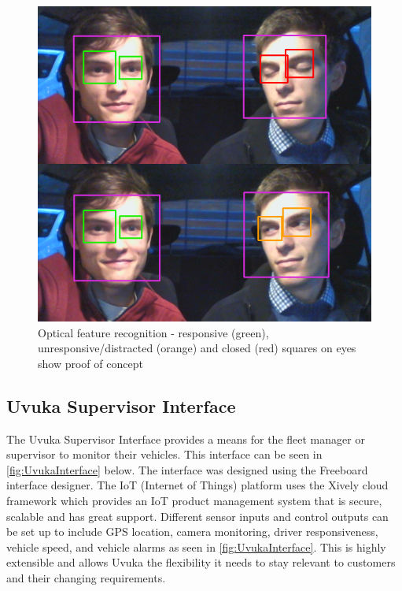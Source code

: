 \begin{figure}[H]
\centering
\includegraphics[width=1\textwidth]{images/ocv}
\vskip10pt
\caption[Optical feature recognition]{Optical feature recognition - responsive (green), unresponsive/distracted (orange) and closed (red) squares on eyes show proof of concept}
\label{fig:OpticalFeature}
\end{figure}

\subsection{Uvuka Supervisor Interface}
The Uvuka Supervisor Interface provides a means for the fleet manager or supervisor to monitor their vehicles. This interface can be seen in \cref{fig:UvukaInterface} below. The interface was designed using the Freeboard interface designer. The IoT (Internet of Things) platform uses the Xively cloud framework which provides an IoT  product management system that is secure, scalable and has great support. Different sensor inputs and control outputs can be set up to include GPS location, camera monitoring, driver responsiveness, vehicle speed, and vehicle alarms as seen in \cref{fig:UvukaInterface}. This is highly extensible and allows Uvuka the flexibility it needs to stay relevant to customers and their changing requirements.

